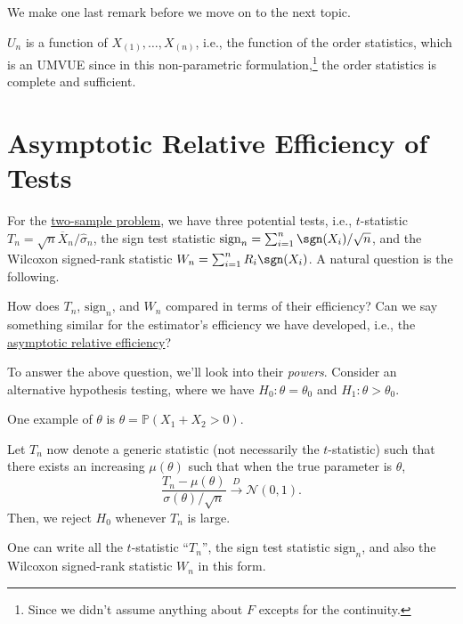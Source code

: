 We make one last remark before we move on to the next topic.

\begin{remark}
	\(U_n\) is a function of \(X_{(1)}, \dots , X_{(n)}\), i.e., the function of the order statistics, which is an UMVUE since in this non-parametric formulation,\footnote{Since we didn't assume anything about \(F\) excepts for the continuity.} the order statistics is complete and sufficient.
\end{remark}

\section{Asymptotic Relative Efficiency of Tests}
For the \hyperref[prb:two-sample]{two-sample problem}, we have three potential tests, i.e., \(t\)-statistic \(T_n = \sqrt{n} \overline{X} _n / \hat{\sigma} _n\), the sign test statistic \(\mathrm{sign} _n = \sum_{i=1}^{n} \sgn (X_i) / \sqrt{n}\), and the Wilcoxon signed-rank statistic \(W_n = \sum_{i=1}^{n} R_i \sgn (X_i)\). A natural question is the following.

\begin{problem*}
	How does \(T_n\), \(\mathrm{sign} _n\), and \(W_n\) compared in terms of their efficiency? Can we say something similar for the estimator's efficiency we have developed, i.e., the \hyperref[def:asymptotic-relative-efficiency-estimator]{asymptotic relative efficiency}?
\end{problem*}

To answer the above question, we'll look into their \emph{powers}. Consider an alternative hypothesis testing, where we have \(H_0 \colon \theta = \theta _0\) and \(H_1 \colon \theta > \theta _0\).

\begin{eg}
	One example of \(\theta \) is \(\theta = \mathbb{P} (X_1 + X_2 > 0)\).
\end{eg}

Let \(T_n\) now denote a generic statistic (not necessarily the \(t\)-statistic) such that there exists an increasing \(\mu (\theta )\) such that when the true parameter is \(\theta \),
\[
	\frac{T_n - \mu (\theta )}{\sigma (\theta ) / \sqrt{n} }
	\overset{D}{\to} \mathcal{N} (0, 1).
\]
Then, we reject \(H_0\) whenever \(T_n\) is large.

\begin{eg}
	One can write all the \(t\)-statistic ``\(T_n\)'', the sign test statistic \(\mathrm{sign} _n\), and also the Wilcoxon signed-rank statistic \(W_n\) in this form.
\end{eg}

